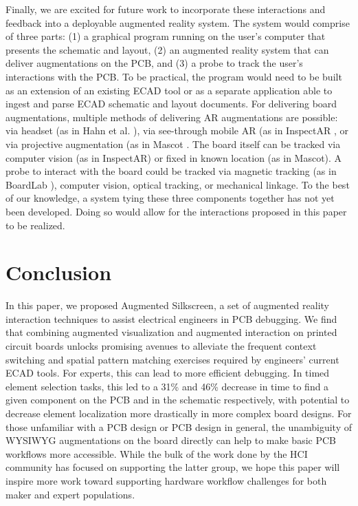 \documentclass [11pt, proquest] {uwthesis}[2020/02/24]
\newcommand{\ASname}{Augmented Silkscreen}
\begin{document}
Finally, we are excited for future work to incorporate these interactions and feedback into a deployable augmented reality system. The system would comprise of three parts: (1) a graphical program running on the user's computer that presents the schematic and layout, (2) an augmented reality system that can deliver augmentations on the PCB, and (3) a probe to track the user's interactions with the PCB. To be practical, the program would need to be built as an extension of an existing ECAD tool or as a separate application able to ingest and parse ECAD schematic and layout documents. For delivering board augmentations, multiple methods of delivering AR augmentations are possible: via headset (as in Hahn et al. \cite{Hahn2015AugmentedProcess}), via see-through mobile AR (as in InspectAR \cite{InspectARTools}, or via projective augmentation (as in Mascot \cite{MascotRobotas}. The board itself can be tracked via computer vision (as in InspectAR) or fixed in known location (as in Mascot). A probe to interact with the board could be tracked via magnetic tracking (as in BoardLab \cite{Goyal2013BoardLab}), computer vision, optical tracking, or mechanical linkage. To the best of our knowledge, a system tying these three components together has not yet been developed. Doing so would allow for the interactions proposed in this paper to be realized.

    

\section{Conclusion}
\label{sec:conclusion}


In this paper, we proposed \ASname, a set of augmented reality interaction techniques to assist electrical engineers in PCB debugging.
We find that combining augmented visualization and augmented interaction on printed circuit boards unlocks promising avenues to alleviate the frequent context switching and spatial pattern matching exercises required by engineers' current ECAD tools.
For experts, this can lead to more efficient debugging. In timed element selection tasks, this led to a 31\% and 46\% decrease in time to find a given component on the PCB and in the schematic respectively, with potential to decrease element localization more drastically in more complex board designs.
For those unfamiliar with a PCB design or PCB design in general, the unambiguity of WYSIWYG augmentations on the board directly can help to make basic PCB workflows more accessible.
While the bulk of the work done by the HCI community has focused on supporting the latter group, we hope this paper will inspire more work toward supporting hardware workflow challenges for both maker and expert populations.
\end{document}
